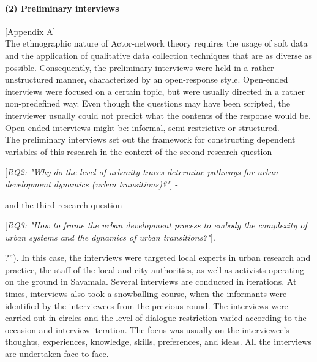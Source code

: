 \documentclass[11pt]{report}
\begin{document}
{{{{\paragraph{(2) Preliminary interviews} 
[\href{ref}{Appendix A}]
\\
The ethnographic nature of Actor-network theory requires the usage of soft data and the application of qualitative data collection techniques that are as diverse as possible. Consequently, the preliminary interviews were held in a rather unstructured manner, characterized by an open-response style. Open-ended interviews were focused on a certain topic, but were usually directed in a rather non-predefined way.  Even though the questions may have been scripted, the interviewer usually could not predict what the contents of the response would be. Open-ended interviews might be: informal, semi-restrictive or structured.
\\

The preliminary interviews set out the framework for constructing dependent variables of this research in the context of the second research question -

[\textit{RQ2: "Why do the level of urbanity traces determine pathways for urban development dynamics (urban transitions)?"}] -

and the third research question -

[\textit{RQ3: "How to frame the  urban development process to embody the complexity of urban systems and the dynamics of urban transitions?"}].

?”). In this case, the interviews were targeted local experts in urban research and practice, the staff of the local and city authorities, as well as activists operating on the ground in Savamala. Several interviews are conducted in iterations. At times, interviews also took a snowballing course, when the informants were identified by the interviewees from the previous round. The interviews were carried out in circles and the level of dialogue restriction varied according to the occasion and interview iteration. The focus was usually on the interviewee’s thoughts, experiences, knowledge, skills, preferences, and ideas. All the interviews are undertaken face-to-face.
\\

}}}}
\end{document}
